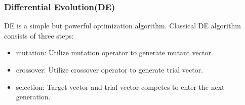 \documentclass[xcolor=dvipsnames]{beamer}
\begin{document}
    \begin{frame}
    \frametitle{Differential Evolution(DE)}
    
    DE is a simple but powerful optimization algorithm. Classical DE algorithm consists of three steps:
    \begin{itemize}
    \item mutation: Utilize mutation operator to generate mutant vector.
    \item crossover: Utilize crossover operator to generate trial vector.
    \item selection: Target vector and trial vector competes to enter the next generation.
    \end{itemize}


    \end{frame}
\end{document}
